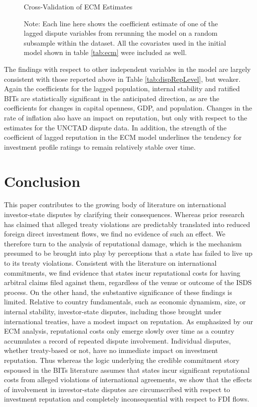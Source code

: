\documentclass[12pt,onesided]{amsart}
\begin{document}
\begin{figure}[ht]
	\vspace{4cm}
	\centering
	\caption{Cross-Validation of ECM Estimates}
	\label{fig:ecmCross}
	\resizebox{1\textwidth}{!}{}	
	\caption*{Note: Each line here shows the coefficient estimate of one of the lagged dispute variables from rerunning the model on a random subsample within the dataset. All the covariates used in the initial model shown in table \ref{tab:ecm} were included as well.}
\end{figure}

The findings with respect to other independent variables in the model are largely consistent with those reported above in Table \ref{tab:dispRepLevel}, but weaker. Again the coefficients for the lagged population, internal stability and ratified BITs are statistically significant in the anticipated direction, as are the coefficients for changes in capital openness, GDP, and population. Changes in the rate of inflation also have an impact on reputation, but only with respect to the estimates for the UNCTAD dispute data. In addition, the strength of the coefficient of lagged reputation in the ECM model underlines the tendency for investment profile ratings to remain relatively stable over time.

\section*{Conclusion}

This paper contributes to the growing body of literature on international investor-state disputes by clarifying their consequences. Whereas prior research has claimed that alleged treaty violations are predictably translated into reduced foreign direct investment flows, we find no evidence of such an effect. We therefore turn to the analysis of reputational damage, which is the mechanism presumed to be brought into play by perceptions that a state has failed to live up to its treaty violations. Consistent with the literature on international commitments, we find evidence that states incur reputational costs for having arbitral claims filed against them, regardless of the venue or outcome of the ISDS process. On the other hand, the substantive significance of these findings is limited. Relative to country fundamentals, such as economic dynamism, size, or internal stability, investor-state disputes, including those brought under international treaties, have a modest impact on reputation. As emphasized by our ECM analysis, reputational costs only emerge slowly over time as a country accumulates a record of repeated dispute involvement. Individual disputes, whether treaty-based or not, have no immediate  impact on investment reputation. Thus whereas the logic underlying the credible commitment story espoused in the BITs literature assumes that states incur significant reputational costs from alleged violations of international agreements, we show that the effects of involvement in investor-state disputes are circumscribed with respect to investment reputation and completely inconsequential with respect to FDI flows.
\end{document}
